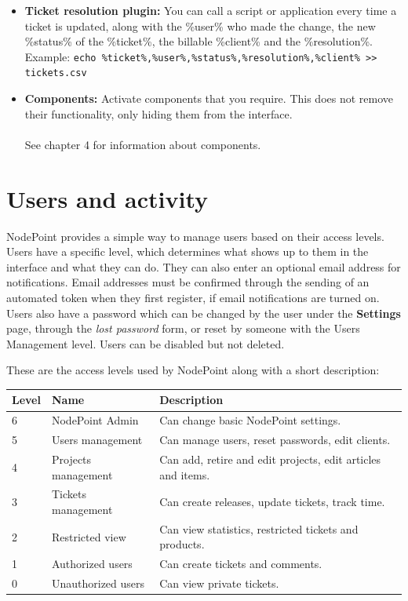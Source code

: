 \documentclass[11pt]{article}
\begin{document}
\begin{itemize}
\item \textbf{Ticket resolution plugin:} You can call a script or application every time a ticket is updated, along with the \%user\% who made the change, the new \%status\% of the \%ticket\%, the billable \%client\% and the \%resolution\%. Example: \texttt{echo \%ticket\%,\%user\%,\%status\%,\%resolution\%,\%client\% >> tickets.csv}
\item \textbf{Components:} Activate components that you require. This does not remove their functionality, only hiding them from the interface.\\\\See chapter 4 for information about components.
\end{itemize}

\clearpage

\section{Users and activity}
NodePoint provides a simple way to manage users based on their access levels. Users have a specific level, which determines what shows up to them in the interface and what they can do. They can also enter an optional email address for notifications. Email addresses must be confirmed through the sending of an automated token when they first register, if email notifications are turned on. Users also have a password which can be changed by the user under the \textbf{Settings} page, through the \textit{lost password} form, or reset by someone with the Users Management level. Users can be disabled but not deleted.

These are the access levels used by NodePoint along with a short description:

\def\arraystretch{1.3} 
\begin{tabular}{ |p{15mm}|p{50mm}|p{100mm}| } 
\hline
\textbf{Level} & \textbf{Name} & \textbf{Description}\\
\hline
6 & NodePoint Admin & Can change basic NodePoint settings.\\
5 & Users management & Can manage users, reset passwords, edit clients.\\
4 & Projects management & Can add, retire and edit projects, edit articles and items.\\
3 & Tickets management & Can create releases, update tickets, track time.\\
2 & Restricted view & Can view statistics, restricted tickets and products.\\
1 & Authorized users & Can create tickets and comments.\\
0 & Unauthorized users & Can view private tickets.\\
\hline
\end{tabular}
\end{document}
